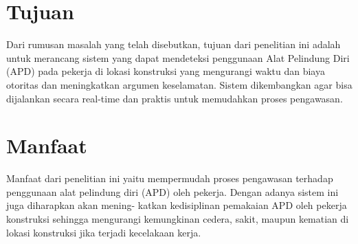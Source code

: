 \section{Tujuan}

Dari rumusan masalah yang telah disebutkan, tujuan dari penelitian ini adalah untuk merancang sistem yang dapat mendeteksi penggunaan Alat Pelindung Diri (APD) pada pekerja di lokasi konstruksi yang mengurangi waktu dan biaya otoritas dan meningkatkan argumen keselamatan. Sistem dikembangkan agar bisa dijalankan secara real-time dan praktis untuk memudahkan proses pengawasan.

\section{Manfaat}

Manfaat dari penelitian ini yaitu mempermudah proses pengawasan terhadap penggunaan alat pelindung diri (APD) oleh pekerja. Dengan adanya sistem ini juga diharapkan akan mening- katkan kedisiplinan pemakaian APD oleh pekerja konstruksi sehingga mengurangi kemungkinan cedera, sakit, maupun kematian di lokasi konstruksi jika terjadi kecelakaan kerja.